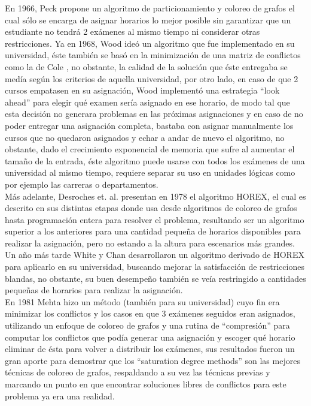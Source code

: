 \documentclass[letter, 10pt]{article}
\begin{document}
En 1966, Peck \cite{10.1145/365696.365713} propone un algoritmo de particionamiento y coloreo de grafos el cual sólo se encarga de asignar horarios lo mejor posible sin garantizar que un estudiante no tendrá 2 exámenes al mismo tiempo ni considerar otras restricciones. Ya en 1968, Wood \cite{10.1093/comjnl/11.1.41} ideó un algoritmo que fue implementado en su universidad, éste también se basó en la minimización de una matriz de conflictos como la de Cole \cite{10.1093/comjnl/7.2.117}, no obstante, la calidad de la solución que éste entregaba se medía según los criterios de aquella universidad, por otro lado, en caso de que 2 cursos empatasen en su asignación, Wood implementó una estrategia ``look ahead'' para elegir qué examen sería asignado en ese horario, de modo tal que esta decisión no generara problemas en las próximas asignaciones y en caso de no poder entregar una asignación completa, bastaba con asignar manualmente los cursos que no quedaron asignados y echar a andar de nuevo el algoritmo, no obstante, dado el crecimiento exponencial de memoria que sufre al aumentar el tamaño de la entrada, éste algoritmo puede usarse con todos los exámenes de una universidad al mismo tiempo, requiere separar su uso en unidades lógicas como por ejemplo las carreras o departamentos.\\ 

Más adelante, Desroches et. al. \cite{11731709} presentan en 1978 el algoritmo HOREX, el cual es descrito en sus distintas etapas donde usa desde algoritmos de coloreo de grafos hasta programación entera para resolver el problema, resultando ser un algoritmo superior a los anteriores para una cantidad pequeña de horarios disponibles para realizar la asignación, pero no estando a la altura para escenarios más grandes. Un año más tarde White y Chan \cite{155986.1979.11731735} desarrollaron un algoritmo derivado de HOREX para aplicarlo en su universidad, buscando mejorar la satisfacción de restricciones blandas, no obstante, su buen desempeño también se veía restringido a cantidades pequeñas de horarios para realizar la asignación.\\ 

En 1981 Mehta \cite{10.2307/25060145} hizo un método (también para su universidad) cuyo fin era minimizar los conflictos y los casos en que 3 exámenes seguidos eran asignados, utilizando un enfoque de coloreo de grafos y una rutina de ``compresión'' para computar los conflictos que podía generar una asignación y escoger qué horario eliminar de ésta para volver a distribuir los exámenes, sus resultados fueron un gran aporte para demostrar que los ``saturation degree methods'' son las mejores técnicas de coloreo de grafos, respaldando a su vez las técnicas previas y marcando un punto en que encontrar soluciones libres de conflictos para este problema ya era una realidad.\\
\end{document}
